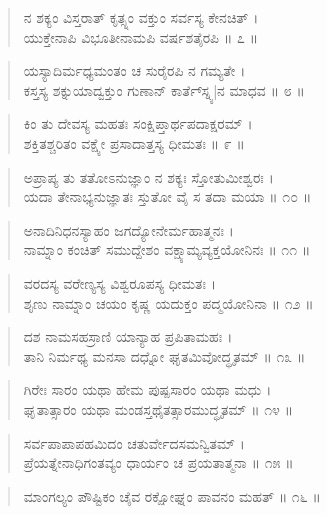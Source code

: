 \begin{verse}
ನ ಶಕ್ಯಂ ವಿಸ್ತರಾತ್ ಕೃತ್ಸ್ನಂ ವಕ್ತುಂ ಸರ್ವಸ್ಯ ಕೇನಚಿತ್ ।\\ಯುಕ್ತೇನಾಪಿ ವಿಭೂತೀನಾಮಪಿ ವರ್ಷಶತೈರಪಿ \num{॥ ೭ ॥}
\end{verse}

\begin{verse}
ಯಸ್ಯಾದಿರ್ಮಧ್ಯಮಂತಂ ಚ ಸುರೈರಪಿ ನ ಗಮ್ಯತೇ ।\\ಕಸ್ತಸ್ಯ ಶಕ್ನುಯಾದ್ವಕ್ತುಂ ಗುಣಾನ್ ಕಾರ್ತೆ್ಸ್ನ್ಯ|ನ ಮಾಧವ \num{॥ ೮ ॥}
\end{verse}

\begin{verse}
ಕಿಂ ತು ದೇವಸ್ಯ ಮಹತಃ ಸಂಕ್ಷಿಪ್ತಾರ್ಥಪದಾಕ್ಷರಮ್ ।\\ಶಕ್ತಿತಶ್ಚರಿತಂ ವಕ್ಷ್ಯೇ ಪ್ರಸಾದಾತ್ತಸ್ಯ ಧೀಮತಃ \num{॥ ೯ ॥}
\end{verse}

\begin{verse}
ಅಪ್ರಾಪ್ಯ ತು ತತೋಽನುಜ್ಞಾಂ ನ ಶಕ್ಯಃ ಸ್ತೋತುಮೀಶ್ವರಃ ।\\ಯದಾ ತೇನಾಭ್ಯನುಜ್ಞಾತಃ ಸ್ತುತೋ ವೈ ಸ ತದಾ ಮಯಾ \num{॥ ೧೦ ॥}
\end{verse}

\begin{verse}
ಅನಾದಿನಿಧನಸ್ಯಾಹಂ ಜಗದ್ಯೋನೇರ್ಮಹಾತ್ಮನಃ ।\\ನಾಮ್ನಾಂ ಕಂಚಿತ್ ಸಮುದ್ದೇಶಂ ವಕ್ಷ್ಯಾಮ್ಯವ್ಯಕ್ತಯೋನಿನಃ \num{॥ ೧೧ ॥}
\end{verse}

\begin{verse}
ವರದಸ್ಯ ವರೇಣ್ಯಸ್ಯ ವಿಶ್ವರೂಪಸ್ಯ ಧೀಮತಃ ।\\ಶೃಣು ನಾಮ್ನಾಂ ಚಯಂ ಕೃಷ್ಣ ಯದುಕ್ತಂ ಪದ್ಮಯೋನಿನಾ \num{॥ ೧೨ ॥}
\end{verse}

\begin{verse}
ದಶ ನಾಮಸಹಸ್ರಾಣಿ ಯಾನ್ಯಾಹ ಪ್ರಪಿತಾಮಹಃ ।\\ತಾನಿ ನಿರ್ಮಥ್ಯ ಮನಸಾ ದಧ್ನೋ ಘೃತಮಿವೋದ್ಧೃತಮ್ \num{॥ ೧೩ ॥}
\end{verse}

\begin{verse}
ಗಿರೇಃ ಸಾರಂ ಯಥಾ ಹೇಮ ಪುಷ್ಪಸಾರಂ ಯಥಾ ಮಧು ।\\ಘೃತಾತ್ಸಾರಂ ಯಥಾ ಮಂಡಸ್ತಥೈತತ್ಸಾರಮುದ್ಧೃತಮ್ \num{॥ ೧೪ ॥}
\end{verse}

\begin{verse}
ಸರ್ವಪಾಪಾಪಹಮಿದಂ ಚತುರ್ವೇದಸಮನ್ವಿತಮ್ ।\\ಪ್ರೆಯತ್ನೇನಾಧಿಗಂತವ್ಯಂ ಧಾರ್ಯಂ ಚ ಪ್ರಯತಾತ್ಮನಾ \num{॥ ೧೫ ॥}
\end{verse}

\begin{verse}
ಮಾಂಗಲ್ಯಂ ಪೌಷ್ಟಿಕಂ ಚೈವ ರಕ್ಷೋಘ್ನಂ ಪಾವನಂ ಮಹತ್ \num{॥ ೧೬ ॥}
\end{verse}

